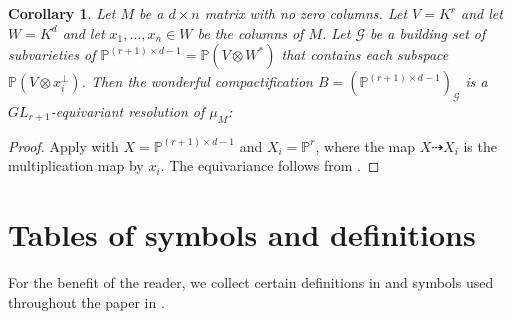 \documentclass[12pt]{amsart}
\newcommand{\mb}{\mathbb}
\newcommand{\mc}{\mathcal}
\newcommand{\wt}{\widetilde}
\theoremstyle{plain}
\newtheorem{Cor}[Thm]{Corollary}
\theoremstyle{definition}
\theoremstyle{remark}
\begin{document}
\begin{Cor}
\label{RMM}
Let $M$ be a $d \times n$ matrix with no zero columns. Let $V = K^r$ and let $W = K^d$ and let $x_1, \ldots, x_n \in W$ be the columns of $M$. Let $\mc{G}$ be a building set of subvarieties of $\mb{P}^{(r+1) \times d-1} = \mb{P}(V \otimes W^*)$ that contains each subspace $\mb{P}(V \otimes x_i^{\perp})$. Then the wonderful compactification $B = (\mb{P}^{(r+1) \times d-1})_\mc{G}$ is a $GL_{r+1}$-equivariant resolution of $\mu_M$:
\begin{center}
\end{center}
\end{Cor}
\begin{proof}
Apply  with $X = \mb{P}^{(r+1) \times d-1}$ and $X_i = \mb{P}^r$, where the map $X \dashrightarrow X_i$ is the multiplication map by $x_i$. The equivariance follows from .
\end{proof}
\section{Tables of symbols and definitions}
\label{tableappendix}
For the benefit of the reader, we collect certain definitions in  and symbols used throughout the paper in .
\end{document}
